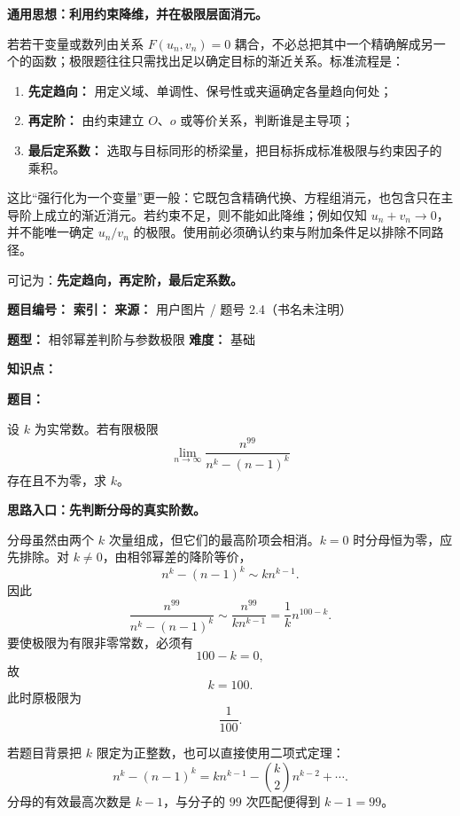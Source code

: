 \begin{knowledgeBox}
\textbf{通用思想：利用约束降维，并在极限层面消元。}

若若干变量或数列由关系 \(F(u_n,v_n)=0\) 耦合，不必总把其中一个精确解成另一个的函数；极限题往往只需找出足以确定目标的渐近关系。标准流程是：
\begin{enumerate}
  \item \textbf{先定趋向：} 用定义域、单调性、保号性或夹逼确定各量趋向何处；
  \item \textbf{再定阶：} 由约束建立 \(O\)、\(o\) 或等价关系，判断谁是主导项；
  \item \textbf{最后定系数：} 选取与目标同形的桥梁量，把目标拆成标准极限与约束因子的乘积。
\end{enumerate}

这比“强行化为一个变量”更一般：它既包含精确代换、方程组消元，也包含只在主导阶上成立的渐近消元。若约束不足，则不能如此降维；例如仅知 \(u_n+v_n\to0\)，并不能唯一确定 \(u_n/v_n\) 的极限。使用前必须确认约束与附加条件足以排除不同路径。

可记为：\textbf{先定趋向，再定阶，最后定系数。}
\end{knowledgeBox}

\begin{problemBox}
\begin{problemMeta}
\textbf{题目编号：}  \quad
\textbf{索引：}  \quad
\textbf{来源：} 用户图片 / 题号 2.4（书名未注明）

\textbf{题型：} 相邻幂差判阶与参数极限 \quad
\textbf{难度：} 基础

\textbf{知识点：} 
\end{problemMeta}

\textbf{题目：}

设 $k$ 为实常数。若有限极限
\[
\lim_{n\to\infty}\frac{n^{99}}{n^k-(n-1)^k}
\]
存在且不为零，求 $k$。
\end{problemBox}

\begin{solutionBox}
\textbf{思路入口：先判断分母的真实阶数。}

分母虽然由两个 $k$ 次量组成，但它们的最高阶项会相消。$k=0$ 时分母恒为零，应先排除。对 $k\ne0$，由相邻幂差的降阶等价，
\[
n^k-(n-1)^k\sim k n^{k-1}.
\]
因此
\[
\frac{n^{99}}{n^k-(n-1)^k}
\sim \frac{n^{99}}{k n^{k-1}}
=\frac1k n^{100-k}.
\]
要使极限为有限非零常数，必须有
\[
100-k=0,
\]
故
\[
\boxed{k=100}.
\]
此时原极限为
\[
\boxed{\frac1{100}}.
\]

若题目背景把 $k$ 限定为正整数，也可以直接使用二项式定理：
\[
n^k-(n-1)^k
=k n^{k-1}-\binom{k}{2}n^{k-2}+\cdots.
\]
分母的有效最高次数是 $k-1$，与分子的 $99$ 次匹配便得到 $k-1=99$。
\end{solutionBox}

